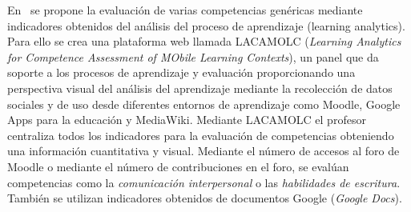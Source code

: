 En~\cite{rayon2014web} se propone la evaluación de varias competencias genéricas mediante indicadores obtenidos del análisis del proceso de aprendizaje (learning analytics). Para ello se crea una plataforma web llamada LACAMOLC (\emph{Learning Analytics for Competence Assessment of MObile Learning Contexts}), un panel que da soporte a los procesos de aprendizaje y evaluación proporcionando una perspectiva visual del análisis del aprendizaje mediante la recolección de datos sociales y de uso desde diferentes entornos de aprendizaje como Moodle, Google Apps para la educación y MediaWiki. Mediante LACAMOLC el profesor centraliza todos los indicadores para la evaluación de competencias obteniendo una información cuantitativa y visual. Mediante el número de accesos al foro de Moodle o mediante el número de contribuciones en el foro, se evalúan competencias como la \emph{comunicación interpersonal} o las \emph{habilidades de escritura}. También se utilizan indicadores obtenidos de documentos Google (\emph{Google Docs}).

